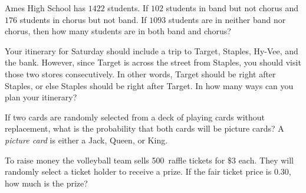 \documentclass[addpoints,12pt]{exam}
\begin{document}
\begin{questions}

\question Ames High School has $1422$ students.
If $102$ students in band but not chorus and
$176$ students in chorus but not band.
If $1093$ students are in neither band nor chorus,
then how many students are in both band and chorus?

\question[10] Your itinerary for Saturday should
include a trip to Target, Staples, Hy-Vee, and the bank.
However, since Target is across the street from Staples,
you should visit those two stores consecutively. In other
words, Target should be right after Staples, or else
Staples should be right after Target. In how many ways
can you plan your itinerary?

\question[10] If two cards are randomly selected from a deck
of playing cards without replacement, what is the probability that both cards
will be picture cards?  A {\em picture card} is either a Jack, Queen, or King.

\question[10] To raise money the volleyball team sells 500~raffle tickets
for $\$3$ each. They will randomly select a ticket holder to receive
a prize. If the fair ticket price is $0.30$, how much is the prize?

\end{questions}

\vfill
\begin{center}\gradetable[h][questions]\end{center}
\end{document}
